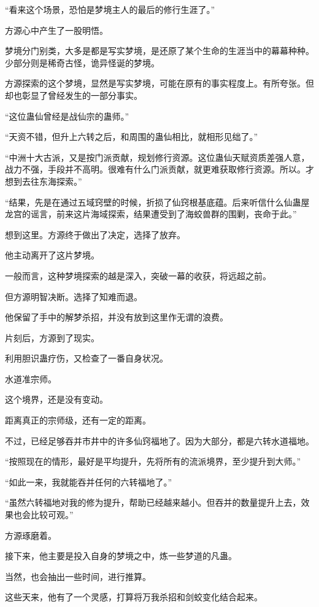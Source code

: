 \begin{this_body}
“看来这个场景，恐怕是梦境主人的最后的修行生涯了。”

方源心中产生了一股明悟。

梦境分门别类，大多是都是写实梦境，是还原了某个生命的生涯当中的幕幕种种。少部分则是稀奇古怪，诡异怪诞的梦境。

方源探索的这个梦境，显然是写实梦境，可能在原有的事实程度上。有所夸张。但却也彰显了曾经发生的一部分事实。

“这位蛊仙曾经是战仙宗的蛊师。”

“天资不错，但升上六转之后，和周围的蛊仙相比，就相形见绌了。”

“中洲十大古派，又是按门派贡献，规划修行资源。这位蛊仙天赋资质差强人意，战力不强，手段并不高明。很难有什么门派贡献，就更难获取修行资源。所以。才想到去往东海探索。”

“结果，先是在通过五域窍壁的时候，折损了仙窍根基底蕴。后来听信什么仙蛊屋龙宫的谣言，前来这片海域探索，结果遭受到了海蛟兽群的围剿，丧命于此。”

想到这里。方源终于做出了决定，选择了放弃。

他主动离开了这片梦境。

一般而言，这种梦境探索的越是深入，突破一幕的收获，将远超之前。

但方源明智决断。选择了知难而退。

他保留了手中的解梦杀招，并没有放到这里作无谓的浪费。

片刻后，方源到了现实。

利用胆识蛊疗伤，又检查了一番自身状况。

水道准宗师。

这个境界，还是没有变动。

距离真正的宗师级，还有一定的距离。

不过，已经足够吞并市井中的许多仙窍福地了。因为大部分，都是六转水道福地。

“按照现在的情形，最好是平均提升，先将所有的流派境界，至少提升到大师。”

“如此一来，我就能吞并任何的六转福地了。”

“虽然六转福地对我的修为提升，帮助已经越来越小。但吞并的数量提升上去，效果也会比较可观。”

方源琢磨着。

接下来，他主要是投入自身的梦境之中，炼一些梦道的凡蛊。

当然，也会抽出一些时间，进行推算。

这些天来，他有了一个灵感，打算将万我杀招和剑蛟变化结合起来。


\end{this_body}
